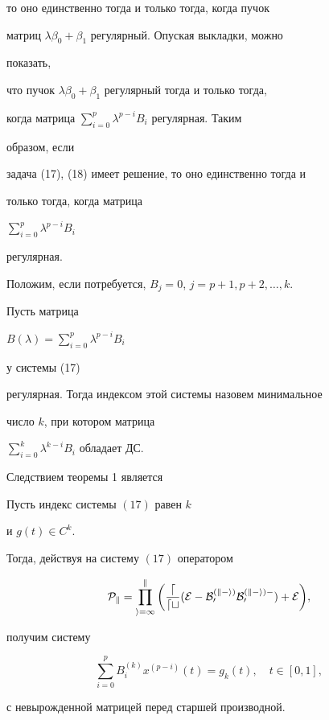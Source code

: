 то оно единственно тогда и только тогда, когда пучок 


матриц $\lambda\beta_0+\beta_1$ регулярный. Опуская выкладки, можно 


показать, 


что пучок $\lambda\beta_0+\beta_1$ регулярный тогда и только тогда, 


когда матрица $\sum\limits^p_{i=0}\lambda^{p-i}B_i$ регулярная. Таким 


образом, если 


задача (17), (18) имеет решение, то оно единственно тогда и 


только тогда, когда матрица 


$\sum\limits^p_{i=0}\lambda^{p-i}B_i$ 


регулярная. 


 


Положим, если потребуется, $B_j=0$, $j=p+1,p+2,\dotsc,k$. 


 


\begin{defn} Пусть матрица 


$B(\lambda)=\sum\limits^p_{i=0}\lambda^{p-i}B_i$ 


у системы (17) 


регулярная. Тогда индексом этой системы назовем минимальное 


число $k$, при котором матрица 


$\sum\limits^k_{i=0}\lambda^{k-i}B_i$ обладает ДС. 


\end{defn} 


 


Следствием теоремы 1 является 


 


\begin{thm} Пусть индекс системы $(17)$ равен $k$ 


и $g(t)\in C^k$. 


Тогда, действуя на систему $(17)$ оператором 


$$ 


\cal P_k=\prod^k_{i=1}\bigg(\frac{d}{dt} 


(E-B^{(k-i)}_0B^{(k-i)-}_0)+E\bigg), 


$$ 


получим систему 


$$ 


\sum^p_{i=0}B^{(k)}_i x^{(p-i)}(t)=g_k(t),\quad t\in[0,1], 


$$ 


с невырожденной матрицей перед старшей производной. 


\end{thm} 


